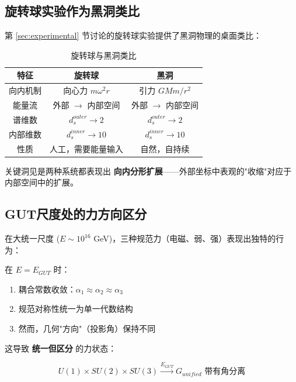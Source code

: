 \subsection{旋转球实验作为黑洞类比}

第 \ref{sec:experimental} 节讨论的旋转球实验提供了黑洞物理的桌面类比：

\begin{table}[htbp]
\centering
\caption{旋转球与黑洞类比}
\begin{tabular}{@{}ccc@{}}
\hline
特征 & 旋转球 & 黑洞 \\
\hline
向内机制 & 向心力 $m\omega^2 r$ & 引力 $GMm/r^2$ \\
能量流 & 外部 $\to$ 内部空间 & 外部 $\to$ 内部空间 \\
谱维数 & $d_s^{outer} \to 2$ & $d_s^{outer} \to 2$ \\
内部维数 & $d_s^{inner} \to 10$ & $d_s^{inner} \to 10$ \\
性质 & 人工，需要能量输入 & 自然，自持续 \\
\hline
\end{tabular}
\label{tab:sphere_bh_analogy}
\end{table}

关键洞见是两种系统都表现出 \textbf{向内分形扩展}——外部坐标中表观的"收缩"对应于内部空间中的扩展。

\subsection{GUT尺度处的力方向区分}

在大统一尺度 ($E \sim 10^{16}$ GeV)，三种规范力（电磁、弱、强）表现出独特的行为：

\begin{theorem}[统一但区分]
在 $E = E_{GUT}$ 时：
\begin{enumerate}
    \item 耦合常数收敛：$\alpha_1 \approx \alpha_2 \approx \alpha_3$
    \item 规范对称性统一为单一代数结构
    \item 然而，几何"方向"（投影角）保持不同
\end{enumerate}
\end{theorem}

这导致 \textbf{统一但区分} 的力状态：

\begin{equation}
    U(1) \times SU(2) \times SU(3) \xrightarrow{E_{GUT}} G_{unified} \text{ 带有角分离}
\end{equation}

